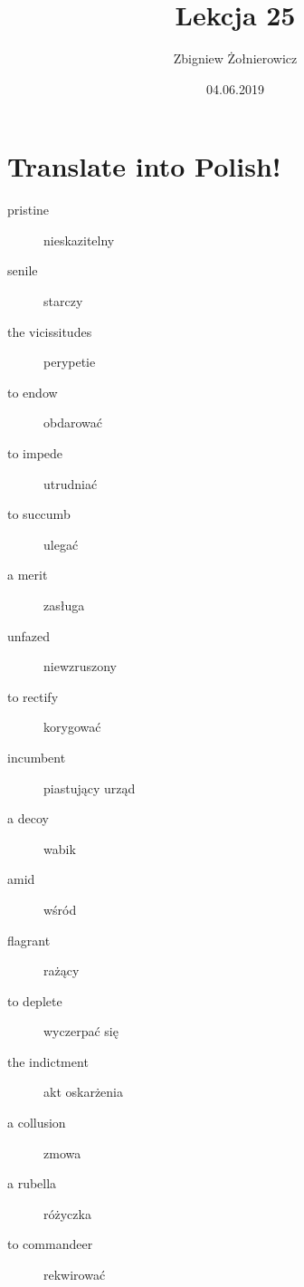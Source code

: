\documentclass{article}
\begin{document}
\title{{\huge Lekcja 25}}
\author{Zbigniew Żołnierowicz}
\date{04.06.2019}
\maketitle
\section{Translate into Polish!}
\begin{description}
    \item[pristine] nieskazitelny
    \item[senile] starczy
    \item[the vicissitudes] perypetie
    \item[to endow] obdarować
    \item[to impede] utrudniać
    \item[to succumb] ulegać
    \item[a merit] zasługa
    \item[unfazed] niewzruszony
    \item[to rectify] korygować
    \item[incumbent] piastujący urząd
    \item[a decoy] wabik
    \item[amid] wśród
    \item[flagrant] rażący
    \item[to deplete] wyczerpać się
    \item[the indictment] akt oskarżenia
    \item[a collusion] zmowa
    \item[a rubella] różyczka
    \item[to commandeer] rekwirować
\end{description}
\end{document}
